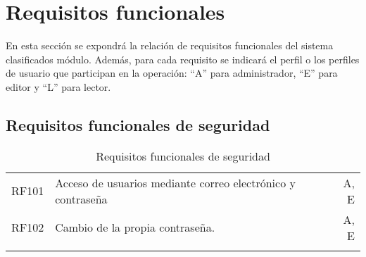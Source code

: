 \section{Requisitos funcionales}
En esta sección se expondrá la relación de requisitos funcionales del sistema clasificados módulo. Además, para cada requisito se indicará el perfil o los perfiles de usuario que participan en la operación: ``A'' para administrador, ``E'' para editor y ``L'' para lector.


\renewcommand{\arraystretch}{1.5} %

\subsection{Requisitos funcionales de seguridad}
\label{cuadro:requisitos-funcionales-de-seguridad}
\begin{longtable}{l|p{13cm}|r}
  RF101\label{RF101} & Acceso de usuarios mediante correo electrónico y contraseña & A, E \\
  RF102\label{RF102} & Cambio de la propia contraseña. & A, E \\
  \caption{Requisitos funcionales de seguridad} \\
\end{longtable}

